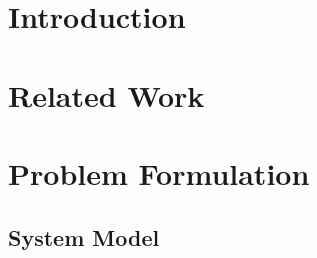 \documentclass[conference]{IEEEtran}
\begin{document}
\section{Introduction}

\section{Related Work}

\section{Problem Formulation}
\label{sec:problem}

\subsection{System Model}
\end{document}
